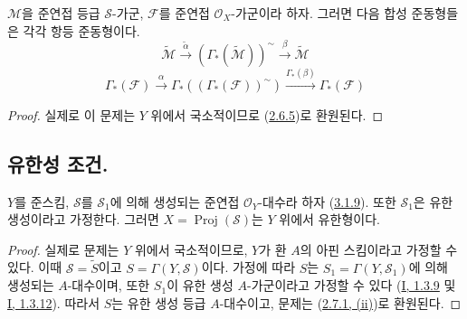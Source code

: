\begin{proposition}[3.3.5]
\label{II.3.3.5-ko}
$\mathcal{M}$을 준연접 등급 $\mathcal{S}$-가군,
$\mathcal{F}$를 준연접 $\mathcal{O}_X$-가군이라 하자. 그러면 다음 합성
준동형들은 각각 항등 준동형이다.
\[
\label{II.3.3.5.1-ko}
  \widetilde{\mathcal{M}}
  \xrightarrow{\widetilde{\alpha}}
  (\Gamma_*(\widetilde{\mathcal{M}}))^{\sim}
  \xrightarrow{\beta}\widetilde{\mathcal{M}}
\tag{3.3.5.1}
\]
\[
\label{II.3.3.5.2-ko}
  \Gamma_*(\mathcal{F})\xrightarrow{\alpha}
  \Gamma_*((\Gamma_*(\mathcal{F}))^{\sim})
  \xrightarrow{\Gamma_*(\beta)}\Gamma_*(\mathcal{F})
\tag{3.3.5.2}
\]
\end{proposition}

\begin{proof}
실제로 이 문제는 $Y$ 위에서 국소적이므로
(\hyperref[II.2.6.5-ko]{2.6.5})로 환원된다.
\end{proof}

\subsection{유한성 조건.}
\label{subsection:II.3.4-ko}


\begin{proposition}[3.4.1]
\label{II.3.4.1-ko}
$Y$를 준스킴, $\mathcal{S}$를 $\mathcal{S}_1$에 의해 생성되는 준연접
$\mathcal{O}_Y$-대수라 하자
(\hyperref[II.3.1.9-ko]{3.1.9}). 또한 $\mathcal{S}_1$은 유한 생성이라고
가정한다. 그러면 $X=\operatorname{Proj}(\mathcal{S})$는 $Y$ 위에서
유한형이다.
\end{proposition}

\begin{proof}
실제로 문제는 $Y$ 위에서 국소적이므로, $Y$가 환 $A$의 아핀 스킴이라고
가정할 수 있다. 이때 $\mathcal{S}=\widetilde{S}$이고
$S=\Gamma(Y,\mathcal{S})$이다. 가정에 따라 $S$는
$S_1=\Gamma(Y,\mathcal{S}_1)$에 의해 생성되는 $A$-대수이며, 또한
$S_1$이 유한 생성 $A$-가군이라고 가정할 수 있다
(\hyperref[I.1.3.9-ko]{I, 1.3.9} 및
\hyperref[I.1.3.12-ko]{I, 1.3.12}). 따라서 $S$는 유한 생성 등급
$A$-대수이고, 문제는
(\hyperref[II.2.7.1-ko]{2.7.1, (ii)})로 환원된다.
\end{proof}

